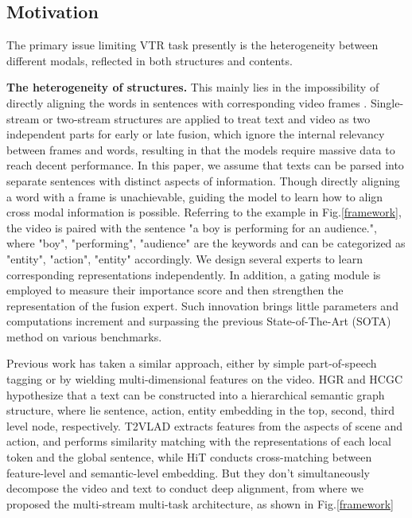 \documentclass[letterpaper]{article} \usepackage{aaai22}  \usepackage{times}  \usepackage{helvet}  \usepackage{courier}  \usepackage[hyphens]{url}  \usepackage{graphicx} \urlstyle{rm} \def\UrlFont{\rm}  \usepackage{natbib}  \usepackage{caption}
\begin{document}
\subsection{Motivation}
The primary issue limiting VTR task presently is the heterogeneity between different modals, reflected in both structures and contents.

\textbf{The heterogeneity of structures.} This mainly 
lies in the impossibility of directly aligning the words in sentences with corresponding video frames \cite{jin2021hierarchical}. Single-stream or two-stream structures are applied to treat text and video as two independent parts for early or late fusion, which ignore the internal relevancy between frames and words, resulting in that the models require massive data to reach decent performance. In this paper, we assume that texts can be parsed into separate sentences with distinct aspects of information. Though directly aligning a word with a frame is unachievable, guiding the model to learn how to align cross modal information is possible. Referring to the example in Fig.\ref{framework}, the video is paired with the sentence "a boy is performing for an audience.", where "boy", "performing", "audience" are the keywords and can be categorized as "entity", "action", "entity" accordingly. We design several experts to learn corresponding  representations independently. In addition, a gating module is employed to measure their importance score and then strengthen the representation of the fusion expert. Such innovation brings little parameters and computations increment and surpassing the previous State-of-The-Art (SOTA) method on various benchmarks.


Previous work has taken a similar approach, either by simple part-of-speech tagging or by wielding multi-dimensional features on the video. HGR \cite{chen2020fine} and HCGC \cite{jin2021hierarchical} hypothesize that a text can be constructed into a hierarchical semantic graph structure, where lie sentence, action, entity embedding in the top, second, third level node, respectively. T2VLAD \cite{wang2021t2vlad} extracts features from the aspects of scene and action, and performs similarity matching with the representations of each local token and the global sentence, while HiT \cite{liu2021hit} conducts cross-matching between feature-level and semantic-level embedding. But they don't simultaneously decompose the video and text to conduct deep alignment, from where we proposed the multi-stream multi-task \cite{ruder2017overview} architecture, as shown in Fig.\ref{framework}
 
\end{document}
